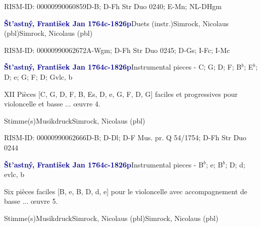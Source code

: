 \documentclass[twocolumn]{book}
\begin{document}
\par RISM-ID: 00000990060859\newline D-B; D-Fh  Str Duo 0240; E-Mn; NL-DHgm
\par \vspace{7pt} \textcolor{darkblue}{\textbf{Št'astný, František Jan  1764c-1826p}}\hfillplus{\textbf{[331]}}\newline Duets (instr.)\newline Simrock, Nicolaus  (pbl)\newline Simrock, Nicolaus  (pbl)
\par RISM-ID: 00000990062672\newline A-Wgm; D-Fh  Str Duo 0245; D-Gs; I-Fc; I-Mc
\par \vspace{7pt} \textcolor{darkblue}{\textbf{Št'astný, František Jan  1764c-1826p}}\hfillplus{\textbf{[332]}}\newline Instrumental pieces - C; G; D; F; B$^b$; E$^b$; D; e; G; F; D; G\newline vlc, b
\par \begin{itshape}XII Pièces [C, G, D, F, B, Es, D, e, G, F, D, G] faciles et progressives pour violoncelle et basse ... œuvre 4.\end{itshape} 
\par \textcolor{darkblue}{}  Stimme(s)\newline Musikdruck\newline Simrock, Nicolaus  (pbl)
\par RISM-ID: 00000990062666\newline D-B; D-Dl; D-F  Mus. pr. Q 54/1754; D-Fh  Str Duo 0244
\par \vspace{7pt} \textcolor{darkblue}{\textbf{Št'astný, František Jan  1764c-1826p}}\hfillplus{\textbf{[333]}}\newline Instrumental pieces - B$^b$; e; B$^b$; D; d; e\newline vlc, b
\par \begin{itshape}Six pièces faciles [B, e, B, D, d, e] pour le violoncelle avec accompagnement de basse ... œuvre 5.\end{itshape} 
\par \textcolor{darkblue}{}  Stimme(s)\newline Musikdruck\newline Simrock, Nicolaus  (pbl)\newline Simrock, Nicolaus  (pbl)
\end{document}
